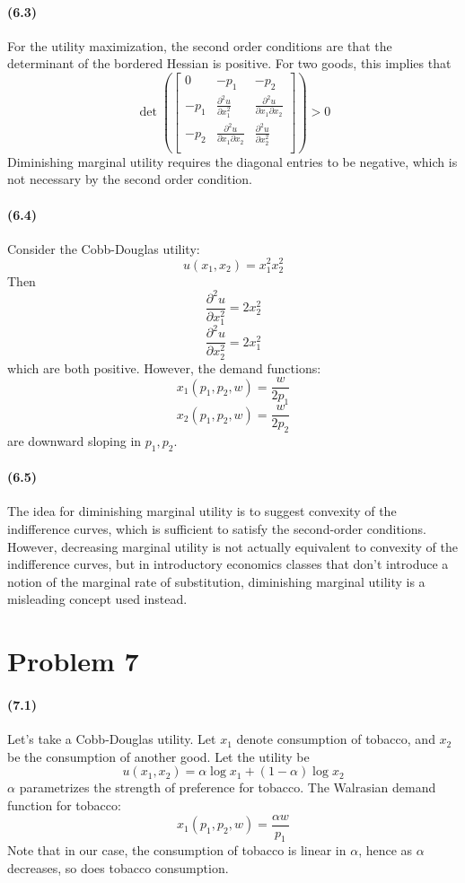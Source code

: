 \documentclass[10pt,letter]{article}
\begin{document}
\paragraph{(6.3)}
For the utility maximization, the second order conditions are that the determinant of the bordered Hessian is positive. For two goods, this implies that
\[ \det \left(\begin{bmatrix}
0 & -p_1 & -p_2 \\
-p_1 & \frac{\partial^2 u}{\partial x_1^2} & \frac{\partial^2 u }{\partial x_1 \partial x_2} \\
-p_2 & \frac{\partial^2 u}{\partial x_1 \partial x_2} & \frac{\partial^2 u}{\partial x_2^2} \\
\end{bmatrix} \right) > 0 \]
Diminishing marginal utility requires the diagonal entries to be negative, which is not necessary by the second order condition.
\paragraph{(6.4)}
Consider the Cobb-Douglas utility:
\[ u(x_1, x_2) = x_1^2x_2^2 \]
Then
\[ \frac{\partial^2 u}{\partial x_1^2} = 2x_2^2 \]
\[ \frac{\partial^2 u}{\partial x_2^2} = 2x_1^2 \]
which are both positive. However, the demand functions:
\[ x_1(p_1, p_2, w) = \frac{w}{2p_1} \]
\[ x_2(p_1, p_2, w) = \frac{w}{2p_2} \]
are downward sloping in $p_1, p_2$.
\paragraph{(6.5)}
The idea for diminishing marginal utility is to suggest convexity of the indifference curves, which is sufficient to satisfy the second-order conditions. However, decreasing marginal utility is not actually equivalent to convexity of the indifference curves, but in introductory economics classes that don't introduce a notion of the marginal rate of substitution, diminishing marginal utility is a misleading concept used instead.
\section*{Problem 7}
\paragraph{(7.1)}
Let's take a Cobb-Douglas utility. Let $x_1$ denote consumption of tobacco, and $x_2$ be the consumption of another good. Let the utility be
\[ u(x_1, x_2) = \alpha \log x_1 + (1-\alpha) \log x_2 \]
$\alpha$ parametrizes the strength of preference for tobacco. The Walrasian demand function for tobacco:
\[ x_1(p_1, p_2, w) = \frac{\alpha w}{p_1} \]
Note that in our case, the consumption of tobacco is linear in $\alpha$, hence as $\alpha$ decreases, so does tobacco consumption.
\end{document}
